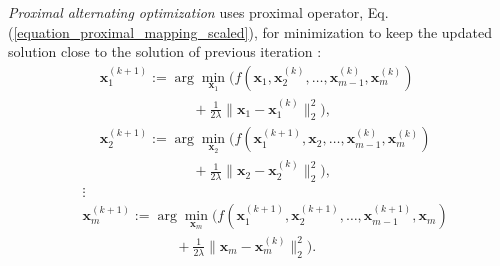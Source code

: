 \documentclass[lang=cn,10pt]{gorgeousnbook}
\numberwithin{equation}{section}%
\numberwithin{figure}{section}%
\begin{document}
\textit{Proximal alternating optimization} uses proximal operator, Eq. (\ref{equation_proximal_mapping_scaled}), for minimization to keep the updated solution close to the solution of previous iteration \cite{li2019alternating}:
\begin{align*}
& \boldsymbol{x}_1^{(k+1)} := \arg \min_{\boldsymbol{x}_1} \Big( f(\boldsymbol{x}_1, \boldsymbol{x}_2^{(k)}, \dots, \boldsymbol{x}_{m-1}^{(k)}, \boldsymbol{x}_m^{(k)}) \\
&~~~~~~~~~~~~~~~~~~~~~~~~~~~~~~ + \frac{1}{2\lambda} \|\boldsymbol{x}_1 - \boldsymbol{x}_1^{(k)}\|_2^2 \Big), \\
& \boldsymbol{x}_2^{(k+1)} := \arg \min_{\boldsymbol{x}_2} \Big( f(\boldsymbol{x}_1^{(k+1)}, \boldsymbol{x}_2, \dots, \boldsymbol{x}_{m-1}^{(k)}, \boldsymbol{x}_m^{(k)}) \\
&~~~~~~~~~~~~~~~~~~~~~~~~~~~~~~ + \frac{1}{2\lambda} \|\boldsymbol{x}_2 - \boldsymbol{x}_2^{(k)}\|_2^2 \Big), 
\end{align*}
\begin{align*}
& \vdots \\
& \boldsymbol{x}_m^{(k+1)} := \arg \min_{\boldsymbol{x}_m} \Big( f(\boldsymbol{x}_1^{(k+1)}, \boldsymbol{x}_2^{(k+1)}, \dots, \boldsymbol{x}_{m-1}^{(k+1)}, \boldsymbol{x}_m) \\
&~~~~~~~~~~~~~~~~~~~~~~~~~~~~~~ + \frac{1}{2\lambda} \|\boldsymbol{x}_m - \boldsymbol{x}_m^{(k)}\|_2^2 \Big).
\end{align*}
\end{document}
